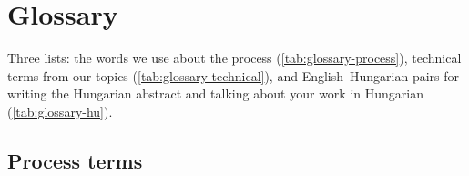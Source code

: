 \clearpage\section{Glossary}\label{app:glossary}
Three lists: the words we use about the process (\cref{tab:glossary-process}), technical terms from our topics (\cref{tab:glossary-technical}), and English--Hungarian pairs for writing the Hungarian abstract and talking about your work in Hungarian (\cref{tab:glossary-hu}).

\subsection{Process terms}
